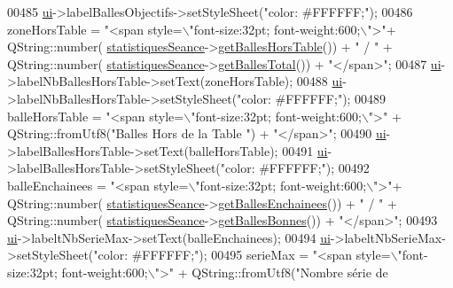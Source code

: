 \begin{DoxyCode}
00485     \hyperlink{class_ttpa_ihm_ad5fae1222a667da158c26f3d0f0dce23}{ui}->labelBallesObjectifs->setStyleSheet(\textcolor{stringliteral}{"color: #FFFFFF;"});
00486     zoneHorsTable = \textcolor{stringliteral}{"<span style=\(\backslash\)"font-size:32pt; font-weight:600;\(\backslash\)">"}+ QString::number(
      \hyperlink{class_ttpa_ihm_abed6897d6f7b4d3a5eb8dcc07651e740}{statistiquesSeance}->\hyperlink{class_statistiques_seance_a26b717d40065e7afd80465458f3cb6aa}{getBallesHorsTable}()) + \textcolor{stringliteral}{" / "} + QString::number(
      \hyperlink{class_ttpa_ihm_abed6897d6f7b4d3a5eb8dcc07651e740}{statistiquesSeance}->\hyperlink{class_statistiques_seance_aaefd0b775012ec914a36a262dc14fc66}{getBallesTotal}()) + \textcolor{stringliteral}{"</span>"};
00487     \hyperlink{class_ttpa_ihm_ad5fae1222a667da158c26f3d0f0dce23}{ui}->labelNbBallesHorsTable->setText(zoneHorsTable);
00488     \hyperlink{class_ttpa_ihm_ad5fae1222a667da158c26f3d0f0dce23}{ui}->labelNbBallesHorsTable->setStyleSheet(\textcolor{stringliteral}{"color: #FFFFFF;"});
00489     balleHorsTable = \textcolor{stringliteral}{"<span style=\(\backslash\)"font-size:32pt; font-weight:600;\(\backslash\)">"} + QString::fromUtf8(\textcolor{stringliteral}{"Balles Hors
       de la Table "}) + \textcolor{stringliteral}{"</span>"};
00490     \hyperlink{class_ttpa_ihm_ad5fae1222a667da158c26f3d0f0dce23}{ui}->labelBallesHorsTable->setText(balleHorsTable);
00491     \hyperlink{class_ttpa_ihm_ad5fae1222a667da158c26f3d0f0dce23}{ui}->labelBallesHorsTable->setStyleSheet(\textcolor{stringliteral}{"color: #FFFFFF;"});
00492     balleEnchainees = \textcolor{stringliteral}{"<span style=\(\backslash\)"font-size:32pt; font-weight:600;\(\backslash\)">"}+ QString::number(
      \hyperlink{class_ttpa_ihm_abed6897d6f7b4d3a5eb8dcc07651e740}{statistiquesSeance}->\hyperlink{class_statistiques_seance_a1f241d7ef584ebffa2246134c63be53b}{getBallesEnchainees}()) + \textcolor{stringliteral}{" / "} + QString::number(
      \hyperlink{class_ttpa_ihm_abed6897d6f7b4d3a5eb8dcc07651e740}{statistiquesSeance}->\hyperlink{class_statistiques_seance_a0dad2ceb22672adf343548b35bf86ba1}{getBallesBonnes}()) + \textcolor{stringliteral}{"</span>"};
00493     \hyperlink{class_ttpa_ihm_ad5fae1222a667da158c26f3d0f0dce23}{ui}->labeltNbSerieMax->setText(balleEnchainees);
00494     \hyperlink{class_ttpa_ihm_ad5fae1222a667da158c26f3d0f0dce23}{ui}->labeltNbSerieMax->setStyleSheet(\textcolor{stringliteral}{"color: #FFFFFF;"});
00495     serieMax =  \textcolor{stringliteral}{"<span style=\(\backslash\)"font-size:32pt; font-weight:600;\(\backslash\)">"} + QString::fromUtf8(\textcolor{stringliteral}{"Nombre série de
}
\end{DoxyCode}
